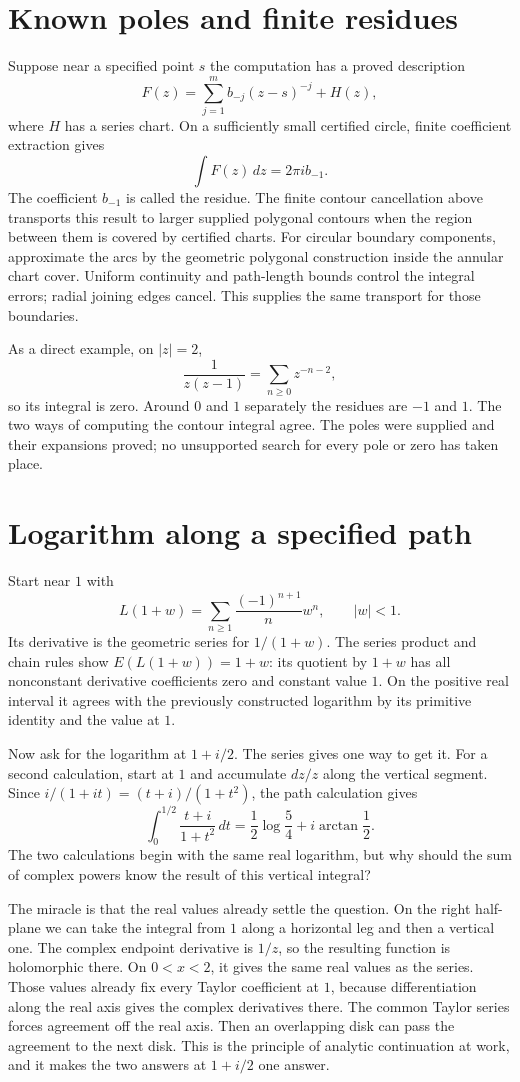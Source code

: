 \section{Known poles and finite residues}
Suppose near a specified point $s$ the computation has a proved description
\[
 F(z)=\sum_{j=1}^m b_{-j}(z-s)^{-j}+H(z),
\]
where $H$ has a series chart.  On a sufficiently small certified circle,
finite coefficient extraction gives
\[
 \int F(z)\,dz=2\pi i b_{-1}.
\]
The coefficient $b_{-1}$ is called the residue.  The finite contour
cancellation above transports this result to larger supplied polygonal
contours when the region between them is covered by certified charts.
For circular boundary components, approximate the arcs by the geometric
polygonal construction inside the annular chart cover.  Uniform continuity
and path-length bounds control the integral errors; radial joining edges
cancel.  This supplies the same transport for those boundaries.

As a direct example, on $|z|=2$,
\[
 \frac1{z(z-1)}=\sum_{n\ge0}z^{-n-2},
\]
so its integral is zero.  Around $0$ and $1$ separately the residues are
$-1$ and $1$.  The two ways of computing the contour integral agree.
The poles were supplied and their expansions proved; no unsupported
search for every pole or zero has taken place.

\section{Logarithm along a specified path}
Start near $1$ with
\[
 L(1+w)=\sum_{n\ge1}\frac{(-1)^{n+1}}n w^n,\qquad |w|<1.
\]
Its derivative is the geometric series for $1/(1+w)$.  The series product
and chain rules show $E(L(1+w))=1+w$: its quotient by $1+w$ has all
nonconstant derivative coefficients zero and constant value $1$.
On the positive real interval it agrees with the previously constructed
logarithm by its primitive identity and the value at $1$.

Now ask for the logarithm at $1+i/2$. The series gives one way to get it.
For a second calculation, start at $1$ and accumulate $dz/z$ along the
vertical segment. Since $i/(1+it)=(t+i)/(1+t^2)$,
the path calculation gives
\[
 \int_0^{1/2}\frac{t+i}{1+t^2}\,dt
 =\frac12\log\frac54+i\arctan\frac12.
\]
The two calculations begin with the same real logarithm, but why should
the sum of complex powers know the result of this vertical integral?

The miracle is that the real values already settle the question. On the
right half-plane we can take the integral from $1$ along a horizontal leg
and then a vertical one. The complex endpoint
derivative is $1/z$, so the resulting function is holomorphic there.
On $0<x<2$, it gives the same real values as the series. Those values
already fix every Taylor coefficient at $1$, because differentiation along
the real axis gives the complex derivatives there. The common Taylor series
forces agreement off the real axis. Then an overlapping disk can pass
the agreement to the next disk. This is the principle of analytic
continuation at work, and it makes the two answers at $1+i/2$ one answer.

